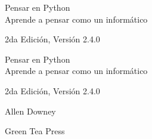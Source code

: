 \documentclass[10pt]{book}
\newcommand{\theversion}{2da Edición, Versión 2.4.0}
\newcommand{\thedate}{}
\begin{document}
\begin{latexonly}

\renewcommand{\blankpage}{\thispagestyle{empty} \quad \newpage}



\thispagestyle{empty}

\begin{flushright}
\vspace*{2.0in}

\begin{spacing}{3}
{\huge Pensar en Python}\\
{\Large Aprende a pensar como un informático}
\end{spacing}

\vspace{0.25in}

\theversion

\thedate

\vfill

\end{flushright}


\blankpage
\blankpage

\pagebreak
\thispagestyle{empty}

\begin{flushright}
\vspace*{2.0in}

\begin{spacing}{3}
{\huge Pensar en Python}\\
{\Large Aprende a pensar como un informático}
\end{spacing}

\vspace{0.25in}

\theversion

\thedate

\vspace{1in}


{\Large
Allen Downey\\
}


\vspace{0.5in}

{\Large Green Tea Press}


\end{flushright}
\end{latexonly}
\end{document}

